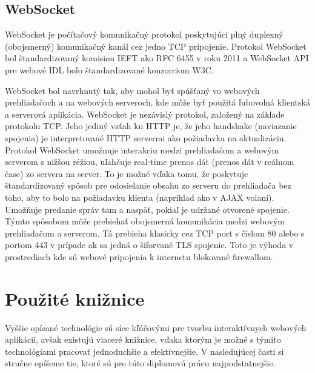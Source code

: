 \subsection{WebSocket}
WebSocket je počítačový komunikačný protokol poskytujúci plný duplexný (obojsmerný)  komunikačný kanál cez jedno TCP pripojenie.
Protokol WebSocket bol štandardizovaný komisiou IEFT ako RFC 6455 v roku 2011 a WebSocket API pre webové IDL bolo štandardizované konzorciom W3C.

WebSocket bol navrhnutý tak, aby mohol byť spúšťaný vo webových prehliadačoch a na webových serveroch, kde môže byť použitá ľubovolná  klientská a serverová aplikácia. WebSocket je nezávislý protokol, založený na základe protokolu TCP. Jeho jediný vzťah ku HTTP je, že jeho handshake (naviazanie spojenia) je interpretované HTTP servermi ako požiadavka na aktualizáciu. Protokol WebSocket umožnuje interakciu medzi prehliadačom a webovým serverom s nižšou réžiou, uľahčuje real-time prenos dát (prenos dát v reálnom čase) zo servera na server. To je možné vďaka tomu, že poskytuje štandardizovaný spôsob pre odosielanie obsahu zo serveru do prehliadača bez toho, aby to bolo na požiadavku klienta (napríklad ako v AJAX volaní). Umožňuje predanie správ tam a naspäť, pokiaľ je udržané otvorené spojenie. Týmto spôsobom môže prebiehať obojsmerná komunikácia medzi webovým prehliadačom a serverom. Tá prebieha klasicky cez TCP port s číslom 80 alebo s portom 443 v prípade ak sa jedná o šiforvané TLS spojenie. Toto je výhoda v prostrediach kde sú webové pripojenia k internetu blokované firewallom.

\section{Použité knižnice}
Vyššie opísané technológie sú síce kľúčovými pre tvorbu interaktívnych webových aplikácií, avšak existujú viaceré knižnice, vďaka ktorým je možné s týmito technológiami pracovať jednoduchšie a efektívnejšie. V nasledujúcej časti si stručne opíšeme tie, ktoré sú pre túto diplomovú prácu najpodstatnejšie.


